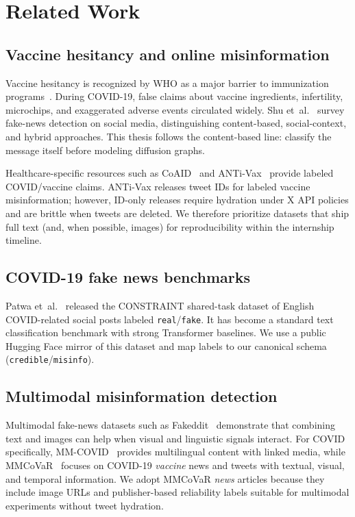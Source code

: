 \chapter{Related Work}
\label{ch:related}

\section{Vaccine hesitancy and online misinformation}

Vaccine hesitancy is recognized by WHO as a major barrier to immunization programs~\cite{macdonald2015hesitancy}.
During COVID-19, false claims about vaccine ingredients, infertility, microchips, and exaggerated adverse events circulated widely.
Shu et~al.~\cite{shu2017fake} survey fake-news detection on social media, distinguishing content-based, social-context, and hybrid approaches.
This thesis follows the content-based line: classify the message itself before modeling diffusion graphs.

Healthcare-specific resources such as CoAID~\cite{cui2020coaid} and ANTi-Vax~\cite{hayawi2022antivax} provide labeled COVID/vaccine claims.
ANTi-Vax releases tweet IDs for labeled vaccine misinformation; however, ID-only releases require hydration under X API policies and are brittle when tweets are deleted.
We therefore prioritize datasets that ship full text (and, when possible, images) for reproducibility within the internship timeline.

\section{COVID-19 fake news benchmarks}

Patwa et~al.~\cite{patwa2021fighting} released the CONSTRAINT shared-task dataset of English COVID-related social posts labeled \texttt{real}/\texttt{fake}.
It has become a standard text classification benchmark with strong Transformer baselines.
We use a public Hugging Face mirror of this dataset and map labels to our canonical schema (\texttt{credible}/\texttt{misinfo}).

\section{Multimodal misinformation detection}

Multimodal fake-news datasets such as Fakeddit~\cite{nakamura2020fakeddit} demonstrate that combining text and images can help when visual and linguistic signals interact.
For COVID specifically, MM-COVID~\cite{li2020mmcovid} provides multilingual content with linked media, while MMCoVaR~\cite{chen2021mmcovar} focuses on COVID-19 \emph{vaccine} news and tweets with textual, visual, and temporal information.
We adopt MMCoVaR \emph{news} articles because they include image URLs and publisher-based reliability labels suitable for multimodal experiments without tweet hydration.

